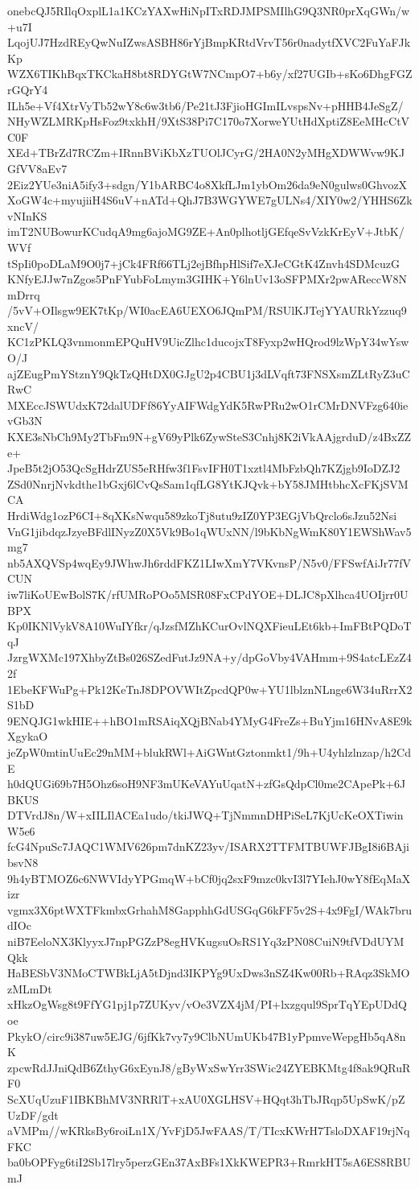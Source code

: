 onebcQJ5RIlqOxplL1a1KCzYAXwHiNpITxRDJMPSMIlhG9Q3NR0prXqGWn/w+u7I
LqojUJ7HzdREyQwNuIZwsASBH86rYjBmpKRtdVrvT56r0nadytfXVC2FuYaFJkKp
WZX6TIKhBqxTKCkaH8bt8RDYGtW7NCmpO7+b6y/xf27UGIb+sKo6DhgFGZrGQrY4
ILh5e+Vf4XtrVyTb52wY8c6w3tb6/Pe21tJ3FjioHGImILvspsNv+pHHB4JeSgZ/
NHyWZLMRKpHsFoz9txkhH/9XtS38Pi7C170o7XorweYUtHdXptiZ8EeMHcCtVC0F
XEd+TBrZd7RCZm+IRnnBViKbXzTUOlJCyrG/2HA0N2yMHgXDWWvw9KJGfVV8aEv7
2Eiz2YUe3niA5ify3+sdgn/Y1bARBC4o8XkfLJm1ybOm26da9eN0gulws0GhvozX
XoGW4c+myujiiH4S6uV+nATd+QhJ7B3WGYWE7gULNs4/XIY0w2/YHHS6ZkvNInKS
imT2NUBowurKCudqA9mg6ajoMG9ZE+An0plhotljGEfqeSvVzkKrEyV+JtbK/WVf
tSpIi0poDLaM9O0j7+jCk4FRf66TLj2ejBfhpHlSif7eXJeCGtK4Znvh4SDMcuzG
KNfyEJJw7nZgos5PnFYubFoLmym3GIHK+Y6lnUv13oSFPMXr2pwAReccW8NmDrrq
/5vV+OIlsgw9EK7tKp/WI0acEA6UEXO6JQmPM/RSUlKJTejYYAURkYzzuq9xncV/
KC1zPKLQ3vnmonmEPQuHV9UicZlhc1ducojxT8Fyxp2wHQrod9lzWpY34wYswO/J
ajZEugPmYStznY9QkTzQHtDX0GJgU2p4CBU1j3dLVqft73FNSXsmZLtRyZ3uCRwC
MXEccJSWUdxK72dalUDFf86YyAIFWdgYdK5RwPRu2wO1rCMrDNVFzg640ievGb3N
KXE3sNbCh9My2TbFm9N+gV69yPlk6ZywSteS3Cnhj8K2iVkAAjgrduD/z4BxZZe+
JpeB5t2jO53QcSgHdrZUS5eRHfw3f1FsvIFH0T1xztl4MbFzbQh7KZjgb9IoDZJ2
ZSd0NnrjNvkdthe1bGxj6lCvQsSam1qfLG8YtKJQvk+bY58JMHtbhcXcFKjSVMCA
HrdiWdg1ozP6CI+8qXKsNwqu589zkoTj8utu9zIZ0YP3EGjVbQrclo6sJzu52Nsi
VnG1jibdqzJzyeBFdlINyzZ0X5Vk9Bo1qWUxNN/l9bKbNgWmK80Y1EWShWav5mg7
nb5AXQVSp4wqEy9JWhwJh6rddFKZ1LIwXmY7VKvnsP/N5v0/FFSwfAiJr77fVCUN
iw7liKoUEwBolS7K/rfUMRoPOo5MSR08FxCPdYOE+DLJC8pXlhca4UOIjrr0UBPX
Kp0IKNlVykV8A10WuIYfkr/qJzsfMZhKCurOvlNQXFieuLEt6kb+ImFBtPQDoTqJ
JzrgWXMc197XhbyZtBs026SZedFutJz9NA+y/dpGoVby4VAHmm+9S4atcLEzZ42f
1EbeKFWuPg+Pk12KeTnJ8DPOVWItZpcdQP0w+YU1lblznNLnge6W34uRrrX2S1bD
9ENQJG1wkHIE++hBO1mRSAiqXQjBNab4YMyG4FreZs+BuYjm16HNvA8E9kXgykaO
jeZpW0mtinUuEc29nMM+blukRWl+AiGWntGztonmkt1/9h+U4yhlzlnzap/h2CdE
h0dQUGi69b7H5Ohz6soH9NF3mUKeVAYuUqatN+zfGsQdpCl0me2CApePk+6JBKUS
DTVrdJ8n/W+xIILIlACEa1udo/tkiJWQ+TjNmmnDHPiSeL7KjUcKeOXTiwinW5e6
fcG4NpuSc7JAQC1WMV626pm7dnKZ23yv/ISARX2TTFMTBUWFJBgI8i6BAjibsvN8
9h4yBTMOZ6c6NWVIdyYPGmqW+bCf0jq2sxF9mzc0kvI3l7YIehJ0wY8fEqMaXizr
vgmx3X6ptWXTFkmbxGrhahM8GapphhGdUSGqG6kFF5v2S+4x9FgI/WAk7brudIOc
niB7EeloNX3KlyyxJ7npPGZzP8egHVKugsuOsRS1Yq3zPN08CuiN9tfVDdUYMQkk
HaBESbV3NMoCTWBkLjA5tDjnd3IKPYg9UxDws3nSZ4Kw00Rb+RAqz3SkMOzMLmDt
xHkzOgWsg8t9FfYG1pj1p7ZUKyv/vOe3VZX4jM/PI+lxzgqul9SprTqYEpUDdQoe
PkykO/circ9i387uw5EJG/6jfKk7vy7y9ClbNUmUKb47B1yPpmveWepgHb5qA8nK
zpcwRdJJniQdB6ZthyG6xEynJ8/gByWxSwYrr3SWic24ZYEBKMtg4f8ak9QRuRF0
ScXUqUzuF1IBKBhMV3NRRlT+xAU0XGLHSV+HQqt3hTbJRqp5UpSwK/pZUzDF/gdt
aVMPm//wKRksBy6roiLn1X/YvFjD5JwFAAS/T/TIcxKWrH7TsloDXAF19rjNqFKC
ba0bOPFyg6tiI2Sb17lry5perzGEn37AxBFs1XkKWEPR3+RmrkHT5sA6ES8RBUmJ
